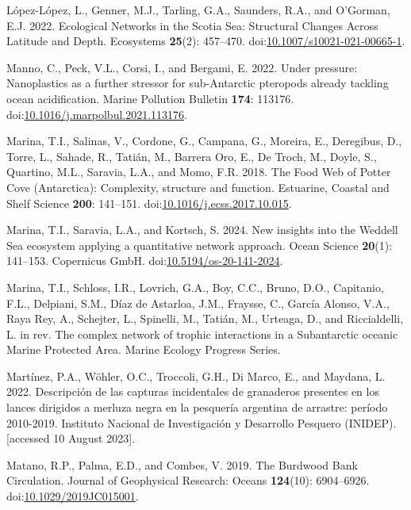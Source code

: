 \documentclass[
]{article}
\newlength{\cslhangindent}
\newenvironment{CSLReferences}[2] %
 {\begin{list}{}{%
  \setlength{\itemindent}{0pt}
  \setlength{\leftmargin}{0pt}
  \setlength{\parsep}{0pt}
  \ifodd #1
   \setlength{\leftmargin}{\cslhangindent}
   \setlength{\itemindent}{-1\cslhangindent}
  \fi
  \setlength{\itemsep}{#2\baselineskip}}}
 {\end{list}}
\begin{document}
\begin{CSLReferences}{1}{0}
López-López, L., Genner, M.J., Tarling, G.A., Saunders, R.A., and
O'Gorman, E.J. 2022. Ecological {Networks} in the {Scotia Sea}:
{Structural Changes Across Latitude} and {Depth}. Ecosystems
\textbf{25}(2): 457--470.
doi:\href{https://doi.org/10.1007/s10021-021-00665-1}{10.1007/s10021-021-00665-1}.

Manno, C., Peck, V.L., Corsi, I., and Bergami, E. 2022. Under pressure:
{Nanoplastics} as a further stressor for sub-{Antarctic} pteropods
already tackling ocean acidification. Marine Pollution Bulletin
\textbf{174}: 113176.
doi:\href{https://doi.org/10.1016/j.marpolbul.2021.113176}{10.1016/j.marpolbul.2021.113176}.

Marina, T.I., Salinas, V., Cordone, G., Campana, G., Moreira, E.,
Deregibus, D., Torre, L., Sahade, R., Tatián, M., Barrera Oro, E., De
Troch, M., Doyle, S., Quartino, M.L., Saravia, L.A., and Momo, F.R.
2018. The {Food Web} of {Potter Cove} ({Antarctica}): Complexity,
structure and function. Estuarine, Coastal and Shelf Science
\textbf{200}: 141--151.
doi:\href{https://doi.org/10.1016/j.ecss.2017.10.015}{10.1016/j.ecss.2017.10.015}.

Marina, T.I., Saravia, L.A., and Kortsch, S. 2024. New insights into the
{Weddell Sea} ecosystem applying a quantitative network approach. Ocean
Science \textbf{20}(1): 141--153. Copernicus GmbH.
doi:\href{https://doi.org/10.5194/os-20-141-2024}{10.5194/os-20-141-2024}.

Marina, T.I., Schloss, I.R., Lovrich, G.A., Boy, C.C., Bruno, D.O.,
Capitanio, F.L., Delpiani, S.M., Díaz de Astarloa, J.M., Fraysse, C.,
García Alonso, V.A., Raya Rey, A., Schejter, L., Spinelli, M., Tatián,
M., Urteaga, D., and Riccialdelli, L. in rev. The complex network of
trophic interactions in a {Subantarctic} oceanic {Marine Protected
Area}. Marine Ecology Progress Series.

Martínez, P.A., Wöhler, O.C., Troccoli, G.H., Di Marco, E., and Maydana,
L. 2022. {Descripci{ó}n de las capturas incidentales de granaderos
presentes en los lances dirigidos a merluza negra en la pesquer{í}a
argentina de arrastre: per{í}odo 2010-2019.} Instituto Nacional de
Investigaci{ó}n y Desarrollo Pesquero (INIDEP). {[}accessed 10 August
2023{]}.

Matano, R.P., Palma, E.D., and Combes, V. 2019. The {Burdwood Bank
Circulation}. Journal of Geophysical Research: Oceans \textbf{124}(10):
6904--6926.
doi:\href{https://doi.org/10.1029/2019JC015001}{10.1029/2019JC015001}.


\end{CSLReferences}
\end{document}
